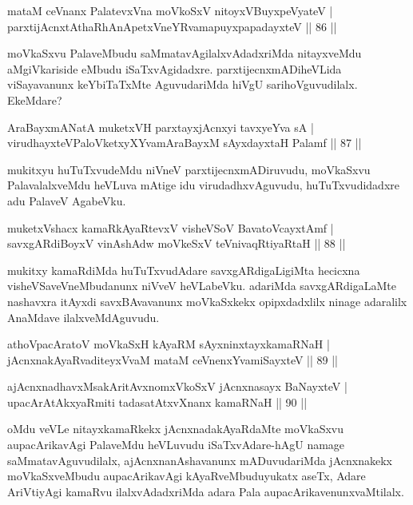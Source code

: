\begin{shl}
mataM ceVnanx PalatevxVna moVkoSxV nitoyxV\s BuyxpeVyateV |\\
parxtijAcnxtAthaRhAnApetxVneYRvamapuyxpapadayxteV \hfill || 86 ||
\end{shl}

\begin{artha}
moVkaSxvu PalaveMbudu saMmatavAgilalxvAdadxriMda nitayxveMdu aMgiVkariside eMbudu iSaTxvAgidadxre. parxtijecnxmADiheVLida viSayavanunx keYbiTaTxMte AguvudariMda hiVgU sarihoVguvudilalx. EkeMdare?
\end{artha}

\begin{shl}
AraBayxmANatA muketxVH parxtayxjAcnxyi tavxyeYva sA |\\
virudhayxteV\s PaloVketxyXYvamAraBayxM sAyxdayxtaH Palamf \hfill || 87 ||
\end{shl}

\begin{artha}
mukitxyu huTuTxvudeMdu niVneV parxtijecnxmADiruvudu, moVkaSxvu PalavalalxveMdu heVLuva mAtige idu virudadhxvAguvudu, huTuTxvudidadxre adu PalaveV AgabeVku.
\end{artha}

\begin{shl}
muketxVshacx kamaRkAyaRtevxV visheVSoV BavatoVcayxtAmf |\\
savxgARdiBoyxV vinAshAdw moVkeSxV teV\s nivaqRtiyaRtaH \hfill || 88 ||
\end{shl}

\begin{artha}
mukitxy kamaRdiMda huTuTxvudAdare savxgARdigaLigiMta hecicxna visheVSaveVneMbudanunx niVveV heVLabeVku. adariMda savxgARdigaLaMte nashavxra itAyxdi savxBAvavanunx moVkaSxkekx opipxdadxlilx ninage adaralilx AnaMdave ilalxveMdAguvudu.
\end{artha}

\begin{shl}
athoVpacAratoV moVkaSxH kAyaRM sAyxninxtayxkamaRNaH |\\
jAcnxnakAyaRvaditeyxVvaM mataM ceVnenxYvamiSayxteV \hfill || 89 ||
\end{shl}

\begin{shl}
ajAcnxnadhavxMsakAritAvxnomxVkoSxV jAcnxnasayx BaNayxteV |\\
upacArAtAkxyaRmiti tadasatAtxvXnanx kamaRNaH \hfill || 90 ||
\end{shl} 

\begin{artha}
oMdu veVLe nitayxkamaRkekx jAcnxnadakAyaRdaMte moVkaSxvu aupacArikavAgi PalaveMdu heVLuvudu iSaTxvAdare-hAgU namage saMmatavAguvudilalx, ajAcnxnanAshavanunx mADuvudariMda jAcnxnakekx moVkaSxveMbudu aupacArikavAgi kAyaRveMbuduyukatx aseTx, Adare AriVtiyAgi kamaRvu ilalxvAdadxriMda adara Pala aupacArikavenunxvaMtilalx.
\end{artha}

